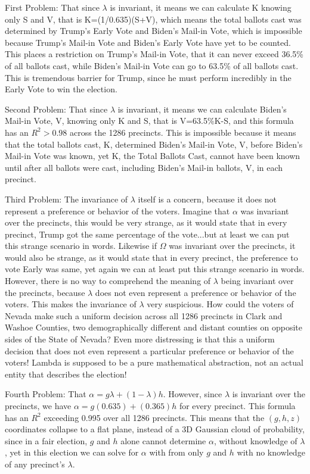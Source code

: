 First Problem: That since $\lambda$ is invariant, it means we can calculate K knowing only S and V, that is K=(1/0.635)(S+V), which means the total ballots cast was determined by Trump's Early Vote and Biden's Mail-in Vote, which is impossible because Trump's Mail-in Vote and Biden's Early Vote have yet to be counted. This places a restriction on Trump's Mail-in Vote, that it can never exceed 36.5\% of all ballots cast, while Biden's Mail-in Vote can go to 63.5\% of all ballots cast. This is tremendous barrier for Trump, since he must perform incredibly in the Early Vote to win the election.

Second Problem: That since $\lambda$ is invariant, it means we can calculate Biden's Mail-in Vote, V, knowing only K and S, that is V=63.5\%K-S, and this formula has an $R^2>0.98$ across the 1286 precincts. This is impossible because it means that the total ballots cast, K, determined Biden's Mail-in Vote, V, before Biden's Mail-in Vote was known, yet K, the Total Ballots Cast, cannot have been known until after all ballots were cast, including Biden's Mail-in ballots, V, in each precinct.

Third Problem:  The invariance of $\lambda$ itself is a concern, because it does not represent a preference or behavior of the voters. Imagine that $\alpha$ was invariant over the precincts, this would be very strange, as it would state that in every precinct, Trump got the same percentage of the vote...but at least we can put this strange scenario in words. Likewise if $\Omega$ was invariant over the precincts, it would also be strange, as it would state that in every precinct, the preference to vote Early was same, yet again we can at least put this strange scenario in words. However, there is no way to comprehend the meaning of $\lambda$ being invariant over the precincts, because $\lambda$ does not even represent a preference or behavior of the voters. This makes the invariance of $\lambda$ very suspicious. How could the voters of Nevada make such a uniform decision across all 1286 precincts in Clark and Washoe Counties, two demographically different and distant counties on opposite sides of the State of Nevada? Even more distressing is that this a uniform decision that does not even represent a particular preference or behavior of the voters! Lambda is supposed to be a pure mathematical abstraction, not an actual entity that describes the election!

Fourth Problem: That $\alpha=g\lambda+(1-\lambda)h$. However, since $\lambda$ is invariant over the precincts, we have $\alpha=g(0.635)+(0.365)h$ for every precinct. This formula has an $R^2$ exceeding 0.995 over all 1286 precincts.  This means that the $(g,h,z)$ coordinates collapse to a flat plane, instead of a 3D Gaussian cloud of probability, since in a fair election, $g$ and $h$ alone cannot determine $\alpha$, without knowledge of $\lambda$, yet in this election we can solve for $\alpha$ with from only $g$ and $h$ with no knowledge of any precinct's $\lambda$.

